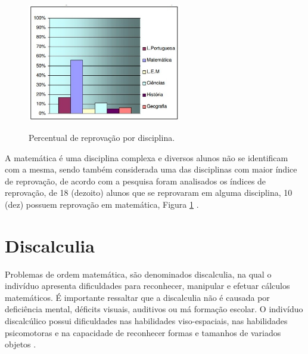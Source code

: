 \documentclass[
	12pt,				%
    oneside,			%
	a4paper,			%
	english,			%
	french,				%
	spanish,			%
	brazil,				%
	]{abntex2}
\begin{document}
\begin{figure} [h] 


\caption{Percentual de reprovação por disciplina.}

\includegraphics[width=0.60\textwidth]{grafico_barras.jpg} %
\\
\centering
{}
\label{reprovacao} 
\end{figure}

A matemática é uma disciplina complexa e diversos alunos não se identificam com a mesma, sendo também considerada uma das disciplinas com maior índice de reprovação, de acordo com a pesquisa foram analisados os índices de reprovação, de 18 (dezoito) alunos que se reprovaram em alguma disciplina, 10 (dez) possuem reprovação em matemática, Figura \ref{reprovacao} \cite{Machado}.







\section{Discalculia}
Problemas de ordem matemática, são denominados discalculia, na qual o indivíduo apresenta dificuldades para reconhecer, manipular e efetuar cálculos matemáticos. É importante ressaltar que a discalculia não é causada por deficiência mental, déficits visuais, auditivos ou má formação escolar. O indivíduo discalcúlico possui dificuldades nas habilidades viso-espaciais, nas habilidades psicomotoras e na capacidade de reconhecer formas e tamanhos de variados objetos \cite{Almeida}.
\end{document}
